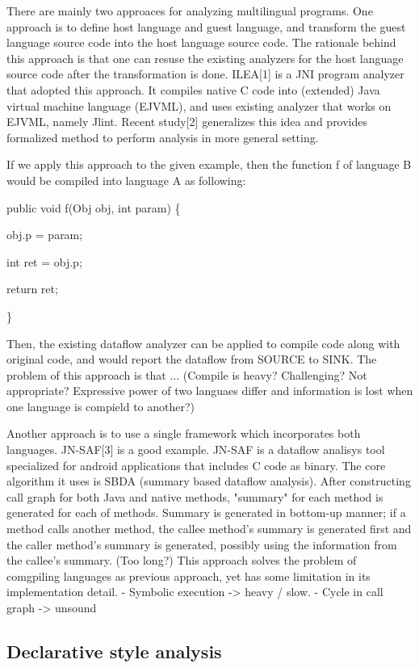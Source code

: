 There are mainly two approaces for analyzing multilingual programs. One
approach is to define host language and guest language, and transform the guest
language source code into the host language source code. The rationale behind
this approach is that one can resuse the existing analyzers for the host
language source code after the transformation is done.  ILEA[1] is a JNI
program analyzer that adopted this approach. It compiles native C code into
(extended) Java virtual machine language (EJVML), and uses existing analyzer
that works on EJVML, namely Jlint.  Recent study[2] generalizes this idea
and provides formalized method to perform analysis in more general setting.

If we apply this approach to the given example, then the function f of language
B would be compiled into language A as following:

public void f(Obj obj, int param) \{

  obj.p = param;

  int ret = obj.p;

  return ret;

\}

Then, the existing dataflow analyzer can be applied to compile code along with
original code, and would report the dataflow from SOURCE to SINK. The problem
of this approach is that ... (Compile is heavy? Challenging? Not appropriate?
Expressive power of two languaes differ and information is lost when one
language is compield to another?)

Another approach is to use a single framework which incorporates both
languages. JN-SAF[3] is a good example.  JN-SAF is a dataflow analisys tool
specialized for android applications that includes C code as binary.  The core
algorithm it uses is SBDA (summary based dataflow analysis). After constructing
call graph for both Java and native methods, "summary" for each method is
generated for each of methods. Summary is generated in bottom-up manner; if a
method calls another method, the callee method's summary is generated first and
the caller method's summary is generated, possibly using the information from
the callee's summary. (Too long?) This approach solves the problem of
comgpiling languages as previous approach, yet has some limitation in its
implementation detail.
- Symbolic execution -> heavy / slow. - Cycle in call graph -> unsound

\subsection{Declarative style analysis}

